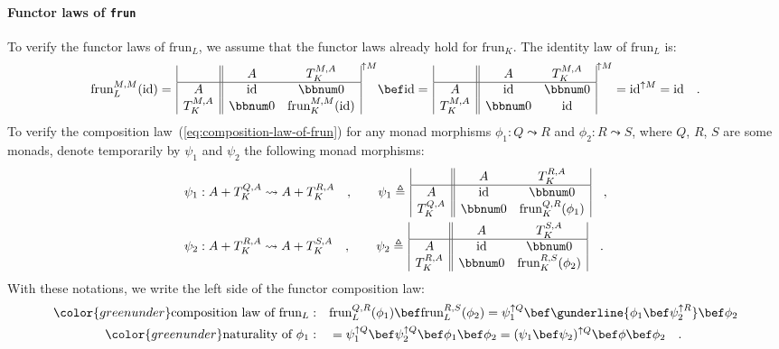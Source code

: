 \paragraph{Functor laws of \texttt{frun}}

To verify the functor laws of $\text{frun}_{L}$, we assume that the
functor laws already hold for $\text{frun}_{K}$. The identity law
of $\text{frun}_{L}$ is:
\[
\text{frun}_{L}^{M,M}(\text{id})=\,\begin{array}{|c||cc|}
 & A & T_{K}^{M,A}\\
\hline A & \text{id} & \bbnum 0\\
T_{K}^{M,A} & \bbnum 0 & \text{frun}_{K}^{M,M}(\text{id})
\end{array}^{\uparrow M}\bef\text{id}=\,\begin{array}{|c||cc|}
 & A & T_{K}^{M,A}\\
\hline A & \text{id} & \bbnum 0\\
T_{K}^{M,A} & \bbnum 0 & \text{id}
\end{array}^{\uparrow M}=\text{id}^{\uparrow M}=\text{id}\quad.
\]
To verify the composition law~(\ref{eq:composition-law-of-frun})
for any monad morphisms $\phi_{1}:Q\leadsto R$ and $\phi_{2}:R\leadsto S$,
where $Q$, $R$, $S$ are some monads, denote temporarily by $\psi_{1}$
and $\psi_{2}$ the following monad morphisms:
\begin{align*}
 & \psi_{1}:A+T_{K}^{Q,A}\leadsto A+T_{K}^{R,A}\quad,\quad\quad\psi_{1}\triangleq\,\begin{array}{|c||cc|}
 & A & T_{K}^{R,A}\\
\hline A & \text{id} & \bbnum 0\\
T_{K}^{Q,A} & \bbnum 0 & \text{frun}_{K}^{Q,R}(\phi_{1})
\end{array}\quad,\\
 & \psi_{2}:A+T_{K}^{R,A}\leadsto A+T_{K}^{S,A}\quad,\quad\quad\psi_{2}\triangleq\,\begin{array}{|c||cc|}
 & A & T_{K}^{S,A}\\
\hline A & \text{id} & \bbnum 0\\
T_{K}^{R,A} & \bbnum 0 & \text{frun}_{K}^{R,S}(\phi_{2})
\end{array}\quad.
\end{align*}
With these notations, we write the left side of the functor composition
law:
\begin{align*}
{\color{greenunder}\text{composition law of }\text{frun}_{L}:}\quad & \text{frun}_{L}^{Q,R}(\phi_{1})\bef\text{frun}_{L}^{R,S}(\phi_{2})=\psi_{1}^{\uparrow Q}\bef\gunderline{\phi_{1}\bef\psi_{2}^{\uparrow R}}\bef\phi_{2}\\
{\color{greenunder}\text{naturality of }\phi_{1}:}\quad & =\psi_{1}^{\uparrow Q}\bef\psi_{2}^{\uparrow Q}\bef\phi_{1}\bef\phi_{2}=(\psi_{1}\bef\psi_{2})^{\uparrow Q}\bef\phi\bef\phi_{2}\quad.
\end{align*}
